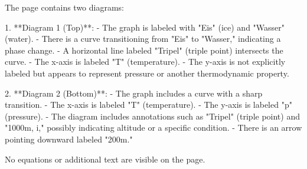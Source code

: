 The page contains two diagrams:  

1. **Diagram 1 (Top)**:  
   - The graph is labeled with "Eis" (ice) and "Wasser" (water).  
   - There is a curve transitioning from "Eis" to "Wasser," indicating a phase change.  
   - A horizontal line labeled "Tripel" (triple point) intersects the curve.  
   - The x-axis is labeled "T" (temperature).  
   - The y-axis is not explicitly labeled but appears to represent pressure or another thermodynamic property.  

2. **Diagram 2 (Bottom)**:  
   - The graph includes a curve with a sharp transition.  
   - The x-axis is labeled "T" (temperature).  
   - The y-axis is labeled "p" (pressure).  
   - The diagram includes annotations such as "Tripel" (triple point) and "1000m, i," possibly indicating altitude or a specific condition.  
   - There is an arrow pointing downward labeled "200m."  

No equations or additional text are visible on the page.